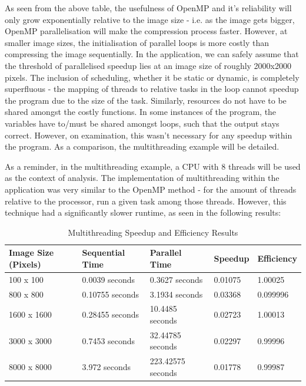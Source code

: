 \documentclass[12pt, a4paper]{article}
\begin{document}
As seen from the above table, the usefulness of OpenMP and it's reliability will only grow exponentially relative to the image size - i.e. as the image gets bigger, OpenMP parallelisation will make the compression process faster. However, at smaller image sizes, the initialisation of parallel loops is more costly than compressing the image sequentially. In the application, we can safely assume that the threshold of parallelised speedup lies at an image size of roughly 2000x2000 pixels. The inclusion of scheduling, whether it be static or dynamic, is completely superfluous - the mapping of threads to relative tasks in the loop cannot speedup the program due to the size of the task. Similarly, resources do not have to be shared amongst the costly functions. In some instances of the program, the variables have to/must be shared amongst loops, such that the output stays correct. However, on examination, this wasn't necessary for any speedup within the program. As a comparison, the multithreading example will be detailed.

As a reminder, in the multithreading example, a CPU with 8 threads will be used as the context of analysis. The implementation of multithreading within the application was very similar to the OpenMP method - for the amount of threads relative to the processor, run a given task among those threads. However, this technique had a significantly slower runtime, as seen in the following results:

\begin{table}[H]
    \centering
    \begin{tabular}{| l | l | l | l | l |}
    \hline
    Image Size (Pixels) & Sequential Time & Parallel Time & Speedup & Efficiency \\ \hline
    100 x 100 & 0.0039 seconds & 0.3627 seconds & 0.01075 & 1.00025 \\ \hline
    800 x 800 & 0.10755 seconds & 3.1934 seconds & 0.03368 & 0.099996 \\ \hline
    1600 x 1600 & 0.28455 seconds & 10.4485 seconds & 0.02723 & 1.00013 \\ \hline
    3000 x 3000 & 0.7453 seconds & 32.44785 seconds & 0.02297 & 0.99996 \\ \hline
    8000 x 8000 & 3.972 seconds & 223.42575 seconds & 0.01778 & 0.99987 \\ \hline
    \end{tabular}
    \caption{Multithreading Speedup and Efficiency Results}
\end{table}
\end{document}

